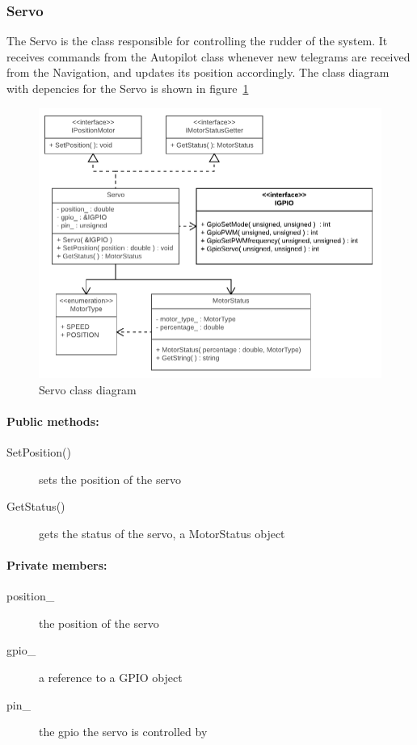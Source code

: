 \subsubsection{Servo}

The Servo is the class responsible for controlling the rudder of the system. It receives commands from the Autopilot class whenever new telegrams are received from the Navigation, and updates its position accordingly. The class diagram with depencies for the Servo is shown in figure~\ref{fig:servo}

\begin{figure}[H]
\centering
\includegraphics[width=1\linewidth]{Images/Design/Servo_class_diagram}
\caption{Servo class diagram}
\label{fig:servo}
\end{figure}

\paragraph{Public methods:}
\begin{adjustwidth}{2.5em}{0pt}\begin{description}
		\item [SetPosition()] sets the position of the servo
		\item [GetStatus()] gets the status of the servo, a MotorStatus object
\end{description}\end{adjustwidth}

\paragraph{Private members:}
\begin{adjustwidth}{2.5em}{0pt}\begin{description}
		\item [position_] the position of the servo
		\item [gpio_] a reference to a GPIO object
		\item [pin_] the gpio the servo is controlled by
\end{description}\end{adjustwidth}

